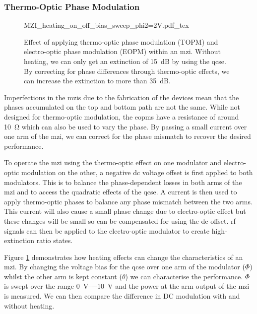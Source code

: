 \subsubsection{Thermo-Optic Phase Modulation}

\begin{figure}[tp]
	\centering
	\small
	\def\svgwidth{0.8\textwidth} 
	{MZI_heating_on_off_bias_sweep_phi2=2V.pdf_tex}
	\caption[MZI optimisation through thermo-optic phase modulation]{Effect of applying thermo-optic phase modulation (TOPM) and electro-optic phase modulation (EOPM) within an \ac{mzi}. Without heating, we can only get an extinction of \SI{15}{dB} by using the \ac{qcse}. By correcting for phase differences through thermo-optic effects, we can increase the extinction to more than \SI{35}{dB}.} %
	\label{fig:mzi_heating}
\end{figure}

Imperfections in the \acp{mzi} due to the fabrication of the devices mean that the phases accumulated on the top and bottom path are not the same. While not designed for thermo-optic modulation, the \acp{eopm} have a resistance of around \SI{10}{\ohm} which can also be used to vary the phase. By passing a small current over one arm of the \ac{mzi}, we can correct for the phase mismatch to recover the desired performance.
\begin{parahigh}
To operate the \ac{mzi} using the thermo-optic effect on one modulator and electro-optic modulation on the other, a negative \acs{dc} voltage offset is first applied to both modulators. This is to balance the phase-dependent losses in both arms of the \ac{mzi} and to access the quadratic effects of the \ac{qcse}. A current is then used to apply thermo-optic phases to balance any phase mismatch between the two arms. This current will also cause a small phase change due to electro-optic effect but these changes will be small so can be compensated for using the \acs{dc} offset. \Acs{rf} signals can then be applied to the electro-optic modulator to create high-extinction ratio states.
\end{parahigh}
Figure \ref{fig:mzi_heating} demonstrates how heating effects can change the characteristics of an \ac{mzi}. By changing the voltage bias for the \ac{qcse} over one arm of the modulator ($\Phi$) whilst the other arm is kept constant ($\theta$) we can characterise the performance. $\Phi$ is swept over the range \SIrange{0}{-10}{V} and the power at the arm output of the \ac{mzi} is measured. We can then compare the difference in DC modulation with and without heating. 

